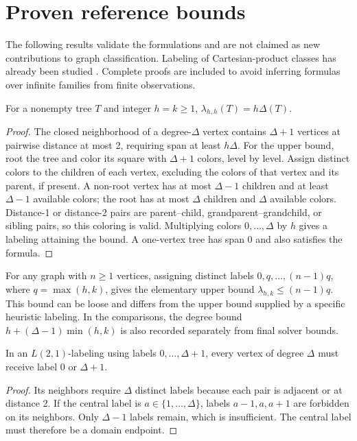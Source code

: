 \section{Proven reference bounds}
The following results validate the formulations and are not claimed as new
contributions to graph classification. Labeling of Cartesian-product classes
has already been studied \cite{calamoneri}. Complete proofs are included
to avoid inferring formulas over infinite families from finite observations.

\begin{proposition}\label{prop:equal-tree}
For a nonempty tree $T$ and integer $h=k\geq1$,
$\lambda_{h,h}(T)=h\Delta(T)$.
\end{proposition}
\begin{proof}
The closed neighborhood of a degree-$\Delta$ vertex contains $\Delta+1$
vertices at pairwise distance at most 2, requiring span at least $h\Delta$.
For the upper bound, root the tree and color its square with $\Delta+1$
colors, level by level. Assign distinct colors to the children of each
vertex, excluding the colors of that vertex and its parent, if present.
A non-root vertex has at most $\Delta-1$ children and at least $\Delta-1$
available colors; the root has at most $\Delta$ children and $\Delta$
available colors. Distance-1 or distance-2 pairs are parent--child,
grandparent--grandchild, or sibling pairs, so this coloring is valid.
Multiplying colors $0,\ldots,\Delta$ by $h$ gives a labeling attaining
the bound. A one-vertex tree has span 0 and also satisfies the formula.
\end{proof}

For any graph with $n\geq1$ vertices, assigning distinct labels
$0,q,\ldots,(n-1)q$, where $q=\max(h,k)$, gives the elementary upper bound
$\lambda_{h,k}\leq(n-1)q$. This bound can be loose and differs from the
upper bound supplied by a specific heuristic labeling. In the comparisons,
the degree bound $h+(\Delta-1)\min(h,k)$ is also recorded separately
from final solver bounds.

\begin{proposition}\label{prop:extreme}
In an $L(2,1)$-labeling using labels $0,\ldots,\Delta+1$, every vertex
of degree $\Delta$ must receive label 0 or $\Delta+1$.
\end{proposition}
\begin{proof}
Its neighbors require $\Delta$ distinct labels because each pair is adjacent
or at distance 2. If the central label is $a\in\{1,\ldots,\Delta\}$,
labels $a-1,a,a+1$ are forbidden on its neighbors. Only $\Delta-1$ labels
remain, which is insufficient. The central label must therefore be a domain endpoint.
\end{proof}


